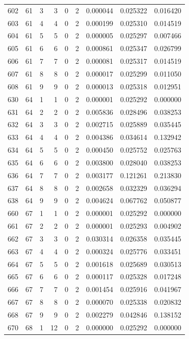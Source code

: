 \begin{longtable}{rrrrrrrrr}
602 & 61 & 3 & 3 & 0 & 2 & 0.000044 & 0.025322 & 0.016420 \\
603 & 61 & 4 & 4 & 0 & 2 & 0.000199 & 0.025310 & 0.014519 \\
604 & 61 & 5 & 5 & 0 & 2 & 0.000005 & 0.025297 & 0.007466 \\
605 & 61 & 6 & 6 & 0 & 2 & 0.000861 & 0.025347 & 0.026799 \\
606 & 61 & 7 & 7 & 0 & 2 & 0.000081 & 0.025317 & 0.014519 \\
607 & 61 & 8 & 8 & 0 & 2 & 0.000017 & 0.025299 & 0.011050 \\
608 & 61 & 9 & 9 & 0 & 2 & 0.000013 & 0.025318 & 0.012951 \\
630 & 64 & 1 & 1 & 0 & 2 & 0.000001 & 0.025292 & 0.000000 \\
631 & 64 & 2 & 2 & 0 & 2 & 0.005836 & 0.028496 & 0.038253 \\
632 & 64 & 3 & 3 & 0 & 2 & 0.002715 & 0.025889 & 0.035445 \\
633 & 64 & 4 & 4 & 0 & 2 & 0.004386 & 0.034614 & 0.132942 \\
634 & 64 & 5 & 5 & 0 & 2 & 0.000450 & 0.025752 & 0.025763 \\
635 & 64 & 6 & 6 & 0 & 2 & 0.003800 & 0.028040 & 0.038253 \\
636 & 64 & 7 & 7 & 0 & 2 & 0.003177 & 0.121261 & 0.213830 \\
637 & 64 & 8 & 8 & 0 & 2 & 0.002658 & 0.032329 & 0.036294 \\
638 & 64 & 9 & 9 & 0 & 2 & 0.004624 & 0.067762 & 0.050877 \\
660 & 67 & 1 & 1 & 0 & 2 & 0.000001 & 0.025292 & 0.000000 \\
661 & 67 & 2 & 2 & 0 & 2 & 0.000001 & 0.025293 & 0.004902 \\
662 & 67 & 3 & 3 & 0 & 2 & 0.030314 & 0.026358 & 0.035445 \\
663 & 67 & 4 & 4 & 0 & 2 & 0.000324 & 0.025776 & 0.033451 \\
664 & 67 & 5 & 5 & 0 & 2 & 0.001618 & 0.025689 & 0.030513 \\
665 & 67 & 6 & 6 & 0 & 2 & 0.000117 & 0.025328 & 0.017248 \\
666 & 67 & 7 & 7 & 0 & 2 & 0.001454 & 0.025916 & 0.041967 \\
667 & 67 & 8 & 8 & 0 & 2 & 0.000070 & 0.025338 & 0.020832 \\
668 & 67 & 9 & 9 & 0 & 2 & 0.002279 & 0.042846 & 0.138152 \\
670 & 68 & 1 & 12 & 0 & 2 & 0.000000 & 0.025292 & 0.000000 \\

\end{longtable}
